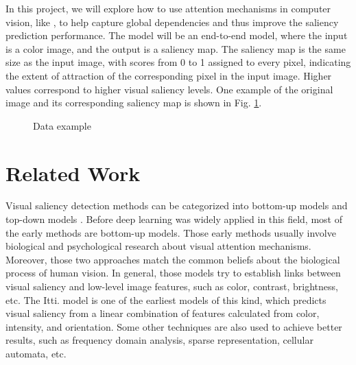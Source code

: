 \documentclass[12pt]{article}
\begin{document}
In this project, we will explore how to use attention mechanisms in computer vision, like \cite{zhangSelfAttentionGenerativeAdversarial2019a},
to help capture global dependencies and thus improve the saliency prediction performance.
The model will be an end-to-end model, where the input is a color image, and the output is a saliency map.
The saliency map is the same size as the input image, with scores from 0 to 1 assigned to every pixel, indicating the extent of attraction of the corresponding pixel in the input image.
Higher values correspond to higher visual saliency levels.
One example of the original image and its corresponding saliency map is shown in Fig. \ref{img:data_example}.
\begin{figure}[!h]
    \centering
    \hspace{5mm}
    \caption{Data example}
    \label{img:data_example}
\end{figure}


\section{Related Work}

Visual saliency detection methods can be categorized into bottom-up models and top-down models \cite{congReviewVisualSaliency2019}.
Before deep learning was widely applied in this field, most of the early methods are bottom-up models.
Those early methods usually involve biological and psychological research about visual attention mechanisms. Moreover, those two approaches match the common beliefs about the biological process of human vision.
In general, those models try to establish links between visual saliency and low-level image features, such as color, contrast, brightness, etc. The Itti. model\cite{ittiModelSaliencybasedVisual1998}
is one of the earliest models of this kind, which predicts visual saliency from a linear combination of features calculated from color, intensity, and orientation.
Some other techniques are also used to achieve better results, such as frequency domain analysis, sparse representation, cellular automata, etc. \cite{congReviewVisualSaliency2019}
\end{document}
